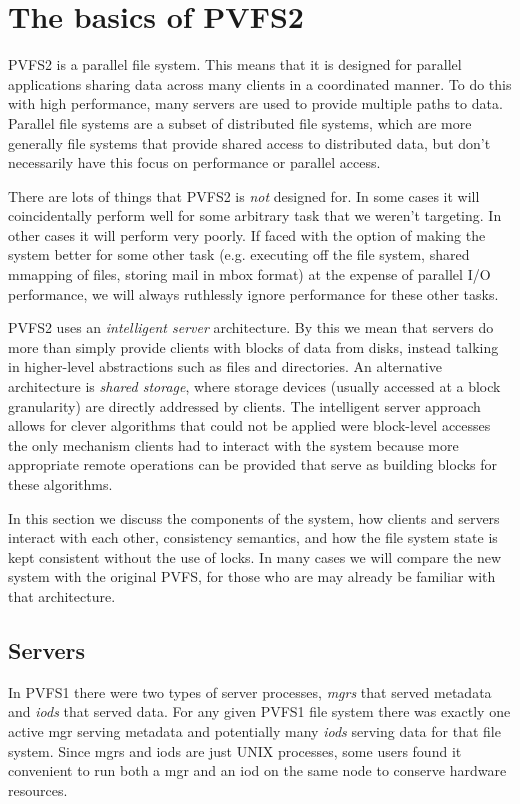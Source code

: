 \section{The basics of PVFS2}
\label{sec:basics}

PVFS2 is a parallel file system.  This means that it is designed for parallel
applications sharing data across many clients in a coordinated manner.  To do
this with high performance, many servers are used to provide multiple paths to
data.  Parallel file systems are a subset of distributed file systems, which
are more generally file systems that provide shared access to distributed
data, but don't necessarily have this focus on performance or parallel access.

There are lots of things that PVFS2 is \emph{not} designed for.  In some cases
it will coincidentally perform well for some arbitrary task that we weren't
targeting.  In other cases it will perform very poorly.  If faced with the
option of making the system better for some other task (e.g. executing off
the file system, shared mmapping of files, storing mail in mbox format) at the
expense of parallel I/O performance, we will always ruthlessly ignore
performance for these other tasks.

PVFS2 uses an \emph{intelligent server} architecture.  By this we mean that
servers do more than simply provide clients with blocks of data from disks,
instead talking in higher-level abstractions such as files and directories.
An alternative architecture is \emph{shared storage}, where storage devices
(usually accessed at a block granularity) are directly addressed by clients.
The intelligent server approach allows for clever algorithms that could not be
applied were block-level accesses the only mechanism clients had to interact
with the system because more appropriate remote operations can be provided
that serve as building blocks for these algorithms.

In this section we discuss the components of the system, how clients and
servers interact with each other, consistency semantics, and how the file
system state is kept consistent without the use of locks.  In many cases we
will compare the new system with the original PVFS, for those who are may
already be familiar with that architecture.

\subsection{Servers}

In PVFS1 there were two types of server processes, \emph{mgrs} that served
metadata and \emph{iods} that served data.  For any given PVFS1 file system
there was exactly one active mgr serving metadata and potentially many
\emph{iods} serving data for that file system.  Since mgrs and iods are just
UNIX processes, some users found it convenient to run both a mgr and an iod on
the same node to conserve hardware resources.

